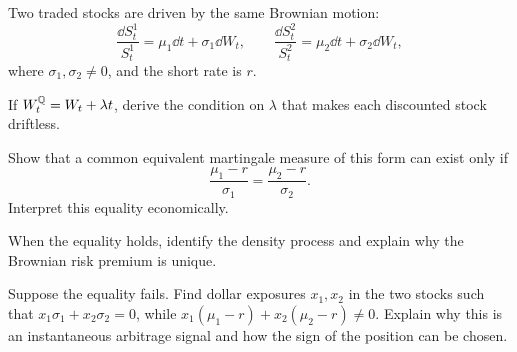 \begin{exercise}
Two traded stocks are driven by the same Brownian motion:
\[
\frac{\dd S_t^1}{S_t^1}=\mu_1\dd t+\sigma_1\dd W_t,
\qquad
\frac{\dd S_t^2}{S_t^2}=\mu_2\dd t+\sigma_2\dd W_t,
\]
where \(\sigma_1,\sigma_2\neq0\), and the short rate is \(r\).
\begin{exparts}
  \item If \(W_t^{\mathbb{Q}}=W_t+\lambda t\), derive the condition on
  \(\lambda\) that makes each discounted stock driftless.
  \item Show that a common equivalent martingale measure of this form can
  exist only if
  \[
  \frac{\mu_1-r}{\sigma_1}
  =
  \frac{\mu_2-r}{\sigma_2}.
  \]
  Interpret this equality economically.
  \item When the equality holds, identify the density process and explain
  why the Brownian risk premium is unique.
  \item Suppose the equality fails. Find dollar exposures $x_1,x_2$ in the
  two stocks such that $x_1\sigma_1+x_2\sigma_2=0$, while
  $x_1(\mu_1-r)+x_2(\mu_2-r)\neq0$. Explain why this is an instantaneous
  arbitrage signal and how the sign of the position can be chosen.
\end{exparts}
\end{exercise}
